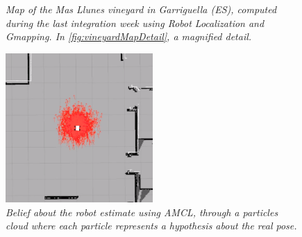\begin{description}
\begin{figure}
\begin{minipage}[c]{.5\textwidth}
	\end{minipage}
	\caption{\textit{Map of the Mas Llunes vineyard in Garriguella (ES), computed during the last integration week using Robot Localization and Gmapping. In \ref{fig:vineyardMapDetail}, a magnified detail.}}
	\label{fig:vineyardMap}
\end{figure}

\begin{figure}
	\centering
	\includegraphics[width=0.5\textwidth]{Images/localization/amcl.png}
	\caption{\textit{Belief about the robot estimate using \ac{AMCL}, through a particles cloud where each particle represents a hypothesis about the real pose.}}
	\label{fig:amclAlgoritmo}
\end{figure}


\end{description}
